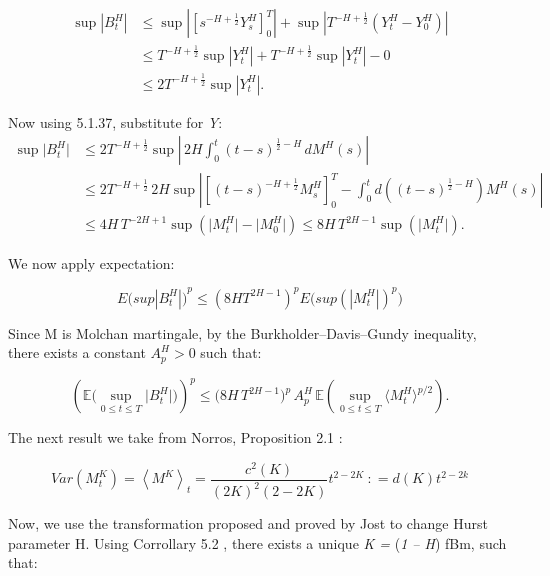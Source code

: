 \documentclass[12pt,a4paper]{report}
\numberwithin{equation}{section}
\begin{document}
\[
\begin{aligned}
\sup |B_{t}^{H}|
&\le \sup\left|\left[s^{-H+\frac{1}{2}}Y_{s}^{H}\right]_{0}^{T}\right|
   + \sup\left|T^{-H+\frac{1}{2}}\left(Y_{t}^{H}-Y_{0}^{H}\right)\right| \\
&\le T^{-H+\frac{1}{2}}\sup\left|Y_{t}^{H}\right|
   + T^{-H+\frac{1}{2}}\sup\left|Y_{t}^{H}\right| - 0 \\
&\le 2T^{-H+\frac{1}{2}}\sup\left|Y_{t}^{H}\right|.
\end{aligned}
\]


Now using 5.1.37, substitute for \emph{Y}:
\[
\begin{aligned}
\sup \lvert B_{t}^{H}\rvert
&\le 2T^{-H+\frac{1}{2}}\sup \left|\,2H\int_{0}^{t}(t-s)^{\frac{1}{2}-H}\,dM^{H}(s)\right| \\
&\le 2T^{-H+\frac{1}{2}}\,2H\sup \left|\left[(t-s)^{-H+\frac{1}{2}}M_{s}^{H}\right]_{0}^{T}
-\int_{0}^{t} d\!\left((t-s)^{\frac{1}{2}-H}\right) M^{H}(s)\right| \\
&\le 4H\,T^{-2H+1}\sup\!\left(\lvert M_{t}^{H}\rvert-\lvert M_{0}^{H}\rvert\right)
\le 8H\,T^{2H-1}\sup\!\left(\lvert M_{t}^{H}\rvert\right).
\end{aligned}
\]


We now apply expectation:

\[{{E(sup}\left| B_{t}^{H} \right|)}^{p} \leq {(8HT^{2H - 1})}^{p}{E(sup}{{(\left| M_{t}^{H} \right|)}^{p})}\]

Since M is Molchan martingale, by the Burkholder--Davis--Gundy inequality,
there exists a constant \(A_{p}^{H} > 0\) such that:

\begin{equation}\tag{5.1.38}\label{eq:5.1.38}
\left(\mathbb{E}\Big(\sup_{0\le t\le T}\big|B_t^{H}\big|\Big)\right)^{p}
\le \big(8H\,T^{2H-1}\big)^{p}\,A_{p}^{H}\,
\mathbb{E}\!\left(\sup_{0\le t\le T}\big\langle M_t^{H}\big\rangle^{p/2}\right).
\end{equation}


The next result we take from Norros, Proposition 2.1 \cite{norros1999elementary_112}:

\[Var\left( M_{t}^{K} \right) = \left\langle M^{K} \right\rangle_{t} = \frac{c^{2}(K)}{(2K)^{2}(2 - 2K)}t^{2 - 2K}\ : = d(K)t^{2 - 2k}\]

Now, we use the transformation proposed and proved by Jost \cite{jost2006transformation_79} to
change Hurst parameter H. Using Corrollary 5.2 \cite{jost2006transformation_79}, there exists a
unique \emph{K =} (\emph{1 -- H}) fBm, such that:
\end{document}
